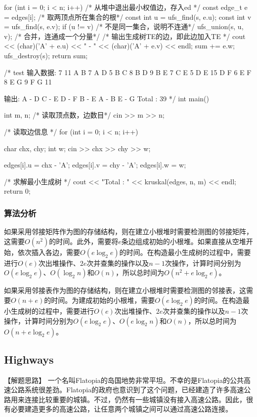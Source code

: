 \begin{Codex}[label=kruskal.cpp]
{    for (int i = 0; i < n; i++) {
        /* 从堆中退出最小权值边，存入ed */
        const edge_t e = edges[i];
        /* 取两顶点所在集合的根*/
        const int u = ufs_find(s, e.u);
        const int v = ufs_find(s, e.v);
        if (u != v) { /* 不是同一集合，说明不连通*/
            ufs_union(s, u, v); /* 合并，连通成一个分量*/
            /* 输出生成树TE的边，即此边加入TE */
            cout << (char)('A' + e.u) << " - " << (char)('A' + e.v) << endl;
            sum += e.w;
        }
    }
    ufs_destroy(s);
    return sum;
}

/* test
输入数据:
7 11
A B 7
A D 5
B C 8
B D 9
B E 7
C E 5
D E 15
D F 6
E F 8
E G 9
F G 11

输出:
A - D
C - E
D - F
B - E
A - B
E - G
Total : 39
*/
int main() {
    int m, n;
    /* 读取顶点数，边数目*/
    cin >> m >> n;

    /* 读取边信息 */
    for (int i = 0; i < n; i++) {
        char chx, chy;
        int w;
        cin >> chx >> chy >> w;

        edges[i].u = chx - 'A';
        edges[i].v = chy - 'A';
        edges[i].w = w;
    }

    /* 求解最小生成树 */
    cout << "Total : " << kruskal(edges, n, m) << endl;
    return 0;
}
\end{Codex}

\subsubsection{算法分析}
如果采用邻接矩阵作为图的存储结构，则在建立小根堆时需要检测图的邻接矩阵，这需要$O(n^2)$的时间。此外，需要将$e$条边组成初始的小根堆。如果直接从空堆开始，依次插入各边，需要$O(e\log_2e)$的时间。在构造最小生成树的过程中，需要进行$O(e)$次出堆操作、$2e$次并查集的操作以及$n-1$次操作，计算时间分别为$O(e\log_2e)$、$O(\log_2n)$和$O(n)$，所以总时间为$O(n^2+e\log_2e)$。

如果采用邻接表作为图的存储结构，则在建立小根堆时需要检测图的邻接表，这需要$O(n+e)$的时间。为建成初始的小根堆，需要$O(e\log_2e)$的时间。在构造最小生成树的过程中，需要进行$O(e)$次出堆操作、$2e$次并查集的操作以及$n-1$次操作，计算时间分别为$O(e\log_2e)$、$O(e\log_2n)$和$O(n)$，所以总时间为$O(n+e\log_2e)$。


\subsection{Highways}
【解题思路】
一个名叫Flatopia的岛国地势非常平坦。不幸的是Flatopia的公共高速公路系统很差劲。Flatopia的政府也意识到了这个问题，已经建造了许多高速公路用来连接比较重要的城镇。不过，仍然有一些城镇没有接入高速公路。因此，很有必要建造更多的高速公路，让任意两个城镇之间可以通过高速公路连接。

